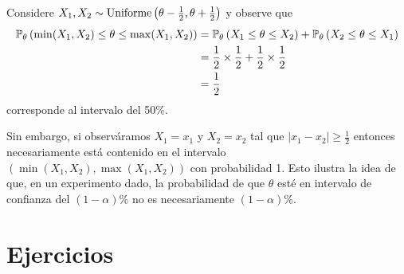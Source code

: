 \begin{example}
\label{eq:unif_int_conf}Considere $X_1,X_2\sim\text{Uniforme}\left(\theta-\tfrac{1}{2},\theta+\tfrac{1}{2}\right)$ y observe que 
\begin{align*}
	\mathbb{P}_\theta \left(\min(X_1,X_2) \leq \theta \leq \max(X_1,X_2)\right) 
		&= \mathbb{P}_\theta \left( X_1 \leq \theta \leq X_2\right)  + \mathbb{P}_\theta \left( X_2 \leq \theta \leq X_1\right) \\
		&= \frac{1}{2}\times \frac{1}{2} + \frac{1}{2}\times\frac{1}{2}\\
		&= \frac{1}{2}
\end{align*}
corresponde al intervalo del 50\%. 

Sin embargo, si observáramos $X_1 = x_1$ y $X_2 = x_2$ tal que $|x_1-x_2|\geq\tfrac{1}{2}$ entonces necesariamente está contenido en el intervalo $(\min(X_1,X_2) , \max(X_1,X_2))$ con probabilidad 1. Esto ilustra la idea de que, en un experimento dado, la probabilidad de que $\theta$ esté en intervalo de confianza del $(1-\alpha)$\% no es necesariamente $(1-\alpha)$\%.
\end{example}


\section{Ejercicios}

